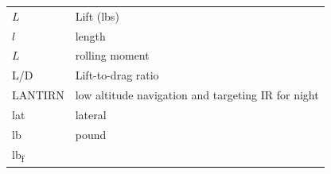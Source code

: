 \documentclass[
]{book}
\begin{document}
\begin{longtable}[]{@{}ll@{}}
\begin{minipage}[t]{0.47\columnwidth}\raggedright
\(L\)\strut
\end{minipage} & \begin{minipage}[t]{0.47\columnwidth}\raggedright
Lift (lbs)\strut
\end{minipage}\tabularnewline
\begin{minipage}[t]{0.47\columnwidth}\raggedright
\(l\)\strut
\end{minipage} & \begin{minipage}[t]{0.47\columnwidth}\raggedright
length\strut
\end{minipage}\tabularnewline
\begin{minipage}[t]{0.47\columnwidth}\raggedright
\(L\)\strut
\end{minipage} & \begin{minipage}[t]{0.47\columnwidth}\raggedright
rolling moment\strut
\end{minipage}\tabularnewline
\begin{minipage}[t]{0.47\columnwidth}\raggedright
L/D\strut
\end{minipage} & \begin{minipage}[t]{0.47\columnwidth}\raggedright
Lift-to-drag ratio\strut
\end{minipage}\tabularnewline
\begin{minipage}[t]{0.47\columnwidth}\raggedright
LANTIRN\strut
\end{minipage} & \begin{minipage}[t]{0.47\columnwidth}\raggedright
low altitude navigation and targeting IR for night\strut
\end{minipage}\tabularnewline
\begin{minipage}[t]{0.47\columnwidth}\raggedright
lat\strut
\end{minipage} & \begin{minipage}[t]{0.47\columnwidth}\raggedright
lateral\strut
\end{minipage}\tabularnewline
\begin{minipage}[t]{0.47\columnwidth}\raggedright
lb\strut
\end{minipage} & \begin{minipage}[t]{0.47\columnwidth}\raggedright
pound\strut
\end{minipage}\tabularnewline
\begin{minipage}[t]{0.47\columnwidth}\raggedright
lb\textsubscript{f}\strut
\end{minipage} & \begin{minipage}[t]{0.47\columnwidth}\raggedright

\end{minipage}
\end{longtable}
\end{document}
